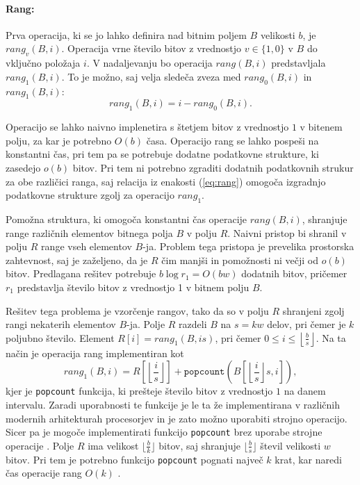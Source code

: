 \paragraph{Rang:} 
Prva operacija, ki se jo lahko definira nad bitnim poljem $B$ velikosti $b$, je $rang_v(B,i)$. Operacija vrne število bitov z vrednostjo $v\in\{1,0\}$ v $B$ do vključno položaja $i$. V nadaljevanju bo operacija $rang(B,i)$ predstavljala $rang_1(B,i)$. To je možno, saj velja sledeča zveza med $rang_0(B,i)$ in $rang_1(B,i)$:
\begin{equation}\label{eq:rang}
    rang_1(B,i)=i-rang_0(B,i).
\end{equation}

Operacijo se lahko naivno implenetira s štetjem bitov z vrednostjo $1$ v bitenem polju, za kar je potrebno $O(b)$ časa. Operacijo rang se lahko pospeši na konstantni čas, pri tem pa se potrebuje dodatne podatkovne strukture, ki zasedejo $o(b)$ bitov. Pri tem ni potrebno zgraditi dodatnih podatkovnih strukur za obe različici ranga, saj relacija iz enakosti (\ref{eq:rang}) omogoča izgradnjo podatkovne strukture zgolj za operacijo $rang_1$.

Pomožna struktura, ki omogoča konstantni čas operacije $rang(B,i)$, shranjuje range različnih elementov bitnega polja $B$ v polju $R$. Naivni pristop bi shranil v polju $R$ range vseh elementov $B$-ja. Problem tega pristopa je prevelika prostorska zahtevnost, saj je zaželjeno, da je $R$ čim manjši in pomožnosti ni večji od $o(b)$ bitov. Predlagana rešitev potrebuje $b\log{r_1}=O(bw)$ dodatnih bitov, pričemer $r_1$ predstavlja število bitov z vrednostjo 1 v bitnem polju $B$.

Rešitev tega problema je vzorčenje rangov, tako da so v polju $R$ shranjeni zgolj rangi nekaterih elementov $B$-ja. Polje $R$ razdeli $B$ na $s=kw$ delov, pri čemer je $k$ poljubno število. Element $R[i]=rang_1(B,is)$, pri čemer $0\le i \le \left\lfloor\frac{b}{s} \right\rfloor$. Na ta način je operacija rang implementiran kot 
\begin{equation*}
    rang_1(B,i)=R\left[\left\lfloor\frac{i}{s} \right\rfloor\right] + \texttt{popcount}\left(B\left[\left\lfloor\frac{i}{s} \right\rfloor s,i\right]\right),
\end{equation*}
kjer je \texttt{popcount} funkcija, ki prešteje število bitov z vrednostjo $1$ na danem intervalu. Zaradi uporabnosti te funkcije je le ta že implementirana v različnih modernih arhitekturah procesorjev in je zato možno uporabiti strojno operacijo. Sicer pa je mogoče implementirati funkcijo \texttt{popcount} brez uporabe strojne operacije \cite{Knuth2011}. Polje $R$ ima velikost $\lfloor\frac{b}{k}\rfloor$ bitov, saj shranjuje $\lfloor\frac{b}{s}\rfloor$ števil velikosti $w$ bitov. Pri tem je potrebno funkcijo \texttt{popcount} pognati največ $k$ krat, kar naredi čas operacije rang $O(k)$ \cite{Navarro2016}.

